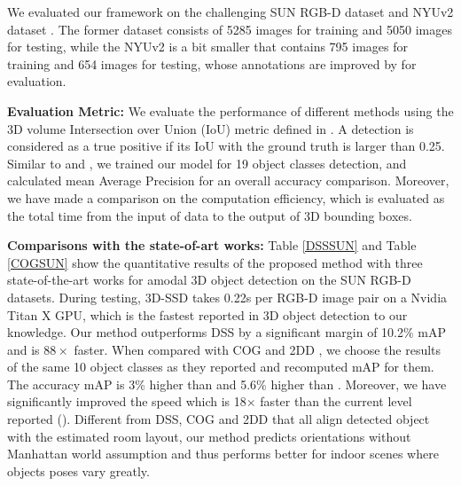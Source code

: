 \documentclass[10pt,twocolumn,letterpaper]{article}
\begin{document}
	We evaluated our framework on the challenging SUN RGB-D dataset \cite{Suran2015SUN} and  NYUv2 dataset \cite{Silberman2012NYU}. The former dataset consists of 5285 images for training and 5050 images for testing, while the NYUv2 is a bit smaller that contains 795 images for training and 654 images for testing, whose annotations are improved by \cite{Deng2017} for evaluation.\par
	\vspace{1mm}
	\noindent\textbf{Evaluation Metric:} We evaluate the performance of different methods using the 3D volume Intersection over Union (IoU) metric defined in \cite{Surans2014sliding}. A detection is considered as a true positive if its IoU with the ground truth is larger than 0.25. Similar to \cite{Suran2016DSS} and \cite{Deng2017}, we trained our model for 19 object classes detection, and calculated mean Average Precision for an overall accuracy comparison. Moreover, we have made a comparison on the computation efficiency, which is evaluated as the total time from the input of data to the output of 3D bounding boxes.\par
	
	\vspace{1mm}
	\noindent\textbf{Comparisons with the state-of-art works:} Table \ref{DSSSUN} and Table \ref{COGSUN} show the quantitative results of the proposed method with three state-of-the-art works for amodal 3D object detection on the SUN RGB-D datasets. During testing, 3D-SSD takes 0.22s per RGB-D image pair on a  Nvidia Titan X GPU, which is the fastest reported in 3D object detection to our knowledge. Our method outperforms DSS\cite{Suran2016DSS} by a significant margin of 10.2\% mAP and is $88\times$ faster. When compared with COG \cite{Zhile2016COG} and 2DD \cite{Jeab20172DD}, we choose the results of the same 10 object classes as they reported and recomputed mAP for them. The accuracy mAP is 3\% higher than \cite{Zhile2016COG} and 5.6\% higher than \cite{Jeab20172DD}. Moreover, we have significantly improved the speed which is 18$\times$ faster than the current level reported (\cite{Jeab20172DD}). Different from DSS, COG and 2DD that all align detected object with the estimated room layout, our method predicts orientations without Manhattan world assumption and thus performs better for indoor scenes where objects poses vary greatly. \par
	
\end{document}
